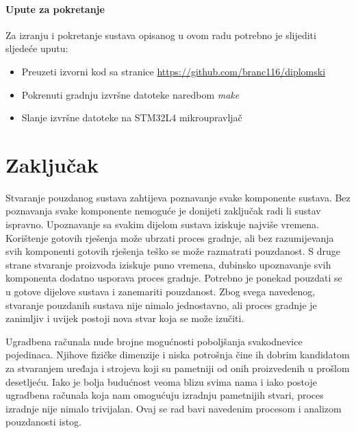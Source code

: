 \documentclass[times, utf8, diplomski]{diplomski}
\begin{document}
\subsubsection{Upute za pokretanje}
Za izranju i pokretanje sustava opisanog u ovom radu potrebno je slijediti sljedeće uputu:

\begin{itemize}
  \item Preuzeti izvorni kod sa stranice \url{https://github.com/branc116/diplomski}
  \item Pokrenuti gradnju izvršne datoteke naredbom \textit{make}
  \item Slanje izvršne datoteke na STM32L4 mikroupravljač
\end{itemize}

\chapter{Zaključak}
Stvaranje pouzdanog sustava zahtijeva poznavanje svake komponente sustava.
Bez poznavanja svake komponente nemoguće je donijeti zaključak radi li sustav ispravno.
Upoznavanje sa svakim dijelom sustava iziskuje najviše vremena.
Korištenje gotovih rješenja može ubrzati proces gradnje, ali bez razumijevanja svih komponenti gotovih rješenja teško se može razmatrati pouzdanost.
S druge strane stvaranje proizvoda iziskuje puno vremena, dubinsko upoznavanje svih komponenta dodatno usporava proces gradnje.
Potrebno je ponekad pouzdati se u gotove dijelove sustava i zanemariti pouzdanost.
Zbog svega navedenog, stvaranje pouzdanih sustava nije nimalo jednostavno, ali proces gradnje je zanimljiv i uvijek postoji nova stvar koja se može izučiti.

\nocite{*}



\listoffigures

\lstlistoflistings


\begin{sazetak}
Ugradbena računala nude brojne mogućnosti poboljšanja svakodnevice pojedinaca. Njihove fizičke dimenzije i niska potrošnja čine ih dobrim kandidatom za stvaranjem uređaja i strojeva koji su pametniji od onih proizvedenih u prošlom desetljeću. Iako je bolja budućnost veoma blizu svima nama i iako postoje ugradbena računala koja nam omogućuju izradnju pametnijih stvari, proces izradnje nije nimalo trivijalan. Ovaj se rad bavi navedenim procesom i analizom pouzdanosti istog.

\end{sazetak}
\end{document}
